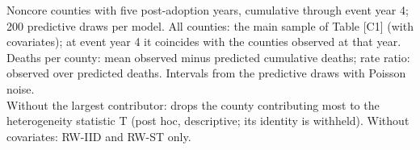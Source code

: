 \begin{table}
\begin{minipage}{\linewidth}
\vspace{.05em}
Noncore counties with five post-adoption years, cumulative through event year 4; 200 predictive draws per model. All counties: the main sample of Table [C1] (with covariates); at event year 4 it coincides with the counties observed at that year.\\
Deaths per county: mean observed minus predicted cumulative deaths; rate ratio: observed over predicted deaths. Intervals from the predictive draws with Poisson noise.\\
Without the largest contributor: drops the county contributing most to the heterogeneity statistic T (post hoc, descriptive; its identity is withheld). Without covariates: RW-IID and RW-ST only.\\
\end{minipage}
\end{table}

